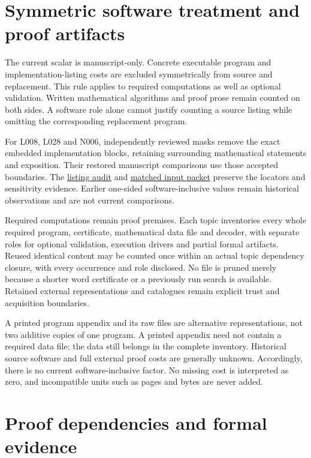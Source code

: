 \documentclass[11pt,a4paper]{article}
\begin{document}
\section{Symmetric software treatment and proof artifacts}

The current scalar is manuscript-only. Concrete executable program and
implementation-listing costs are excluded symmetrically from source and
replacement. This rule applies to required computations as well as optional
validation. Written mathematical algorithms and proof prose remain counted on
both sides. A software role alone cannot justify counting a source listing
while omitting the corresponding replacement program.

For L008, L028 and N006, independently reviewed masks remove the exact embedded
implementation blocks, retaining surrounding mathematical statements and
exposition. Their restored manuscript comparisons use those accepted boundaries.
The \href{overview/v11/listing\_audit/README.rst}{listing audit} and
\href{overview/v12/matched\_inputs/README.rst}{matched input packet} preserve the
locators and sensitivity evidence. Earlier one-sided software-inclusive values
remain historical observations and are not current comparisons.

Required computations remain proof premises. Each topic inventories every
whole required program, certificate, mathematical data file and decoder, with
separate roles for optional validation, execution drivers and partial formal
artifacts. Reused identical content may be counted once within an actual topic
dependency closure, with every occurrence and role disclosed. No file is pruned
merely because a shorter word certificate or a previously run search is available.
Retained external representations and catalogues remain explicit trust and
acquisition boundaries.

A printed program appendix and its raw files are alternative representations,
not two additive copies of one program. A printed appendix need not contain a
required data file; the data still belongs in the complete inventory. Historical
source software and full external proof costs are generally unknown. Accordingly,
there is no current software-inclusive factor. No missing cost is interpreted
as zero, and incompatible units such as pages and bytes are never added.

\section{Proof dependencies and formal evidence}
\end{document}
